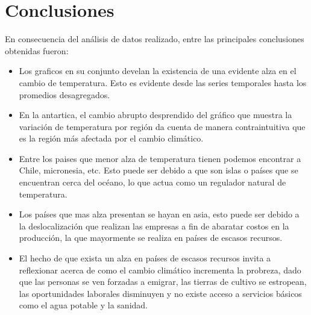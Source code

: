 \documentclass[12pt]{article}
\begin{document}
\section{Conclusiones}  
En consecuencia del análisis de datos realizado, entre las principales conclusiones obtenidas fueron:
\begin{itemize}
    \item Los graficos en su conjunto develan la existencia de una evidente alza en el cambio de temperatura. Esto es evidente desde las series temporales hasta los promedios desagregados.
    \item En la antartica, el cambio abrupto desprendido del gráfico que muestra la variación de temperatura por región da cuenta de manera contraintuitiva que es la región más afectada por el cambio climático.
    \item  Entre los paises que menor alza de temperatura tienen podemos encontrar a Chile, micronesia, etc. Esto puede ser debido a que son islas o países que se encuentran cerca del océano, lo que actua como un regulador natural de temperatura.
    \item Los países que mas alza presentan se hayan en asia, esto puede ser debido a la deslocalización que realizan las empresas a fin de abaratar costos en la producción, la que mayormente se realiza en países de escasos recursos.
    \item El hecho de que exista un alza en países de escasos recursos invita a reflexionar acerca de como el cambio climático incrementa la probreza, dado que las personas se ven forzadas a emigrar, las tierras de cultivo se estropean, las oportunidades laborales disminuyen y no existe acceso a servicios básicos como el agua potable y la sanidad.
\end{itemize}




\newpage
{}
{}



\end{document}
